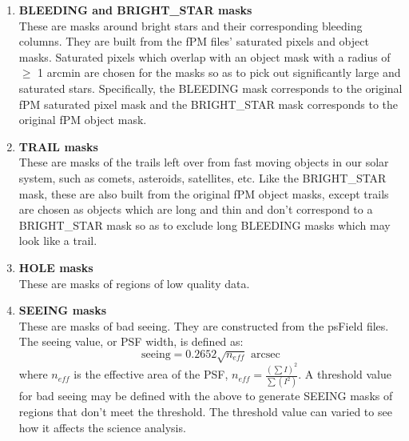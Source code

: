 \documentclass[10pt,letterpaper]{article}
\begin{document}
\begin{enumerate}
\item \textbf{BLEEDING and BRIGHT\_STAR masks}\\
These are masks around bright stars and their corresponding bleeding columns. They are built from the fPM files' saturated pixels and object masks. Saturated pixels which overlap with an object mask with a radius of $\geq$ 1 arcmin are chosen for the masks so as to pick out significantly large and saturated stars.  Specifically, the BLEEDING mask corresponds to the original fPM saturated pixel mask and the BRIGHT\_STAR mask corresponds to the original fPM object mask.
\item \textbf{TRAIL masks}\\
These are masks of the trails left over from fast moving objects in our solar system, such as comets, asteroids, satellites, etc. Like the BRIGHT\_STAR mask, these are also built from the original fPM object masks, except trails are chosen as objects which are long and thin and don't correspond to a BRIGHT\_STAR mask so as to exclude long BLEEDING masks which may look like a trail.
\item \textbf{HOLE masks}\\
These are masks of regions of low quality data.
\item \textbf{SEEING masks}\\
These are masks of bad seeing. They are constructed from the psField files. The seeing value, or PSF width, is defined as:\\
\begin{equation}\nonumber
\text{seeing} = 0.2652\sqrt{n_{eff}} \text{ arcsec}
\end{equation}
where $n_{eff}$ is the effective area of the PSF, $n_{eff} = \frac{(\sum I)^2}{\sum (I^2)}$. A threshold value for bad seeing may be defined with the above to generate SEEING masks of regions that don't meet the threshold. The threshold value can varied to see how it affects the science analysis.
\end{enumerate}
\end{document}
